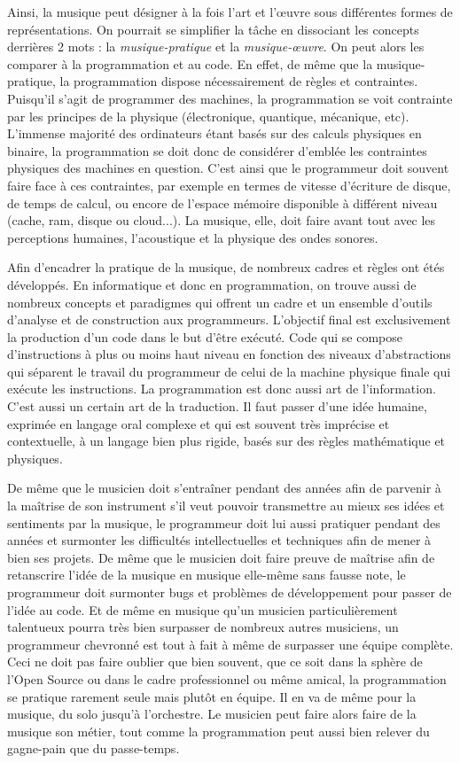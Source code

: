 \documentclass[12pt]{article} %
\begin{document}
Ainsi, la musique peut désigner à la fois l'art et l'œuvre sous différentes formes de représentations. On pourrait se simplifier la tâche en dissociant les concepts derrières 2 mots : la \textit{musique-pratique} et la \textit{musique-œuvre}. On peut alors les comparer à la programmation et au code. En effet, de même que la musique-pratique, la programmation dispose nécessairement de règles et contraintes. Puisqu'il s'agit de programmer des machines, la programmation se voit contrainte par les principes de la physique (électronique, quantique, mécanique, etc). L'immense majorité des ordinateurs étant basés sur des calculs physiques en binaire, la programmation se doit donc de considérer d'emblée les contraintes physiques des machines en question. C'est ainsi que le programmeur doit souvent faire face à ces contraintes, par exemple en termes de vitesse d'écriture de disque, de temps de calcul, ou encore de l'espace mémoire disponible à différent niveau (cache, \acrshort{ram}, disque ou cloud...). La musique, elle, doit faire avant tout avec les perceptions humaines, l'acoustique et la physique des ondes sonores. 

Afin d'encadrer la pratique de la musique, de nombreux cadres et règles ont étés développés. En informatique et donc en programmation, on trouve aussi de nombreux concepts et paradigmes qui offrent un cadre et un ensemble d'outils d'analyse et de construction aux programmeurs. L'objectif final est exclusivement la production d'un code dans le but d'être exécuté. Code qui se compose d'instructions à plus ou moins haut niveau en fonction des niveaux d'abstractions qui séparent le travail du programmeur de celui de la machine physique finale qui exécute les instructions. La programmation est donc aussi art de l'information. C'est aussi un certain art de la traduction. Il faut passer d'une idée humaine, exprimée en langage oral complexe et qui est souvent très imprécise et contextuelle, à un langage bien plus rigide, basés sur des règles mathématique et physiques. 

De même que le musicien doit s'entraîner pendant des années afin de parvenir à la maîtrise de son instrument s'il veut pouvoir transmettre au mieux ses idées et sentiments par la musique, le programmeur doit lui aussi pratiquer pendant des années et surmonter les difficultés intellectuelles et techniques afin de mener à bien ses projets. De même que le musicien doit faire preuve de maîtrise afin de retanscrire l'idée de la musique en musique elle-même sans fausse note, le programmeur doit surmonter bugs et problèmes de développement pour passer de l'idée au code. Et de même en musique qu'un musicien particulièrement talentueux pourra très bien surpasser de nombreux autres musiciens, un programmeur chevronné est tout à fait à même de surpasser une équipe complète. Ceci ne doit pas faire oublier que bien souvent, que ce soit dans la sphère de l'Open Source ou dans le cadre professionnel ou même amical, la programmation se pratique rarement seule mais plutôt en équipe. Il en va de même pour la musique, du solo jusqu'à l'orchestre. Le musicien peut faire alors faire de la musique son métier, tout comme la programmation peut aussi bien relever du gagne-pain que du passe-temps. 
\end{document}
